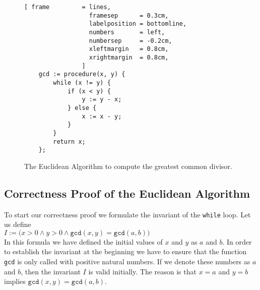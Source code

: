 \begin{figure}[!ht]
\centering
\begin{Verbatim}[ frame         = lines, 
                  framesep      = 0.3cm, 
                  labelposition = bottomline,
                  numbers       = left,
                  numbersep     = -0.2cm,
                  xleftmargin   = 0.8cm,
                  xrightmargin  = 0.8cm,
                ]
    gcd := procedure(x, y) {
        while (x != y) {
            if (x < y) {
                y := y - x;
            } else {
                x := x - y;
            }
        }
        return x;
    };
\end{Verbatim}
\vspace*{-0.3cm}
\caption{The Euclidean Algorithm to compute the greatest common divisor.}
\label{fig:gcd.stlx}
\end{figure}

\subsection{Correctness Proof of the Euclidean Algorithm} 
To start our correctness proof we formulate the invariant of the \texttt{while} loop.
Let us define
\\[0.2cm]
\hspace*{1.3cm}
$ I := \bigl(x > 0 \wedge y > 0 \wedge \texttt{gcd}(x,y) = \texttt{gcd}(a,b) \bigr)$
\\[0.2cm]
In this formula we have defined the initial values of $x$ and $y$ as $a$ and $b$.
In order to establish the invariant at the beginning we have to ensure that the function
\texttt{gcd} is only called with positive natural numbers.  If we denote these numbers as 
$a$ and $b$, then the invariant $I$ is valid initially.  The reason is that $x = a$ and $y = b$
implies $\texttt{gcd}(x,y) = \texttt{gcd}(a,b)$.


